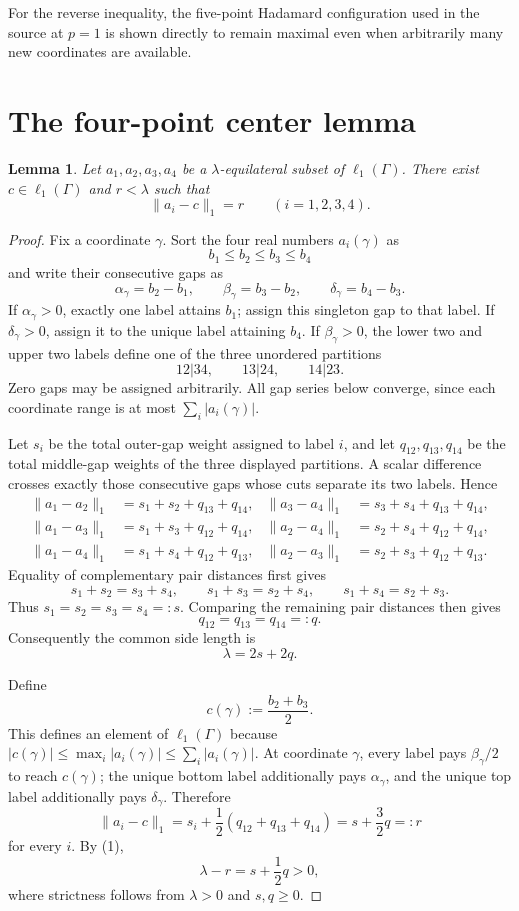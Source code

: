 \documentclass[11pt]{article}
\newtheorem{lemma}[theorem]{Lemma}
\newcommand{\ellone}{\ell_1}
\begin{document}
For the reverse inequality, the five-point Hadamard configuration used in the source at $p=1$ is shown directly to remain maximal even when arbitrarily many new coordinates are available.

\section{The four-point center lemma}

\begin{lemma}\label{lem:center}
Let $a_1,a_2,a_3,a_4$ be a $\lambda$-equilateral subset of $\ellone(\Gamma)$. There exist $c\in\ellone(\Gamma)$ and $r<\lambda$ such that
\[
 \|a_i-c\|_1=r\qquad(i=1,2,3,4).
\]
\end{lemma}

\begin{proof}
Fix a coordinate $\gamma$. Sort the four real numbers $a_i(\gamma)$ as
\[
 b_1\leq b_2\leq b_3\leq b_4
\]
and write their consecutive gaps as
\[
 \alpha_\gamma=b_2-b_1,\qquad
 \beta_\gamma=b_3-b_2,\qquad
 \delta_\gamma=b_4-b_3.
\]
If $\alpha_\gamma>0$, exactly one label attains $b_1$; assign this singleton gap to that label. If $\delta_\gamma>0$, assign it to the unique label attaining $b_4$. If $\beta_\gamma>0$, the lower two and upper two labels define one of the three unordered partitions
\[
 12|34,\qquad13|24,\qquad14|23.
\]
Zero gaps may be assigned arbitrarily. All gap series below converge, since each coordinate range is at most $\sum_i|a_i(\gamma)|$.

Let $s_i$ be the total outer-gap weight assigned to label $i$, and let $q_{12},q_{13},q_{14}$ be the total middle-gap weights of the three displayed partitions. A scalar difference crosses exactly those consecutive gaps whose cuts separate its two labels. Hence
\begin{align*}
 \|a_1-a_2\|_1&=s_1+s_2+q_{13}+q_{14},&
 \|a_3-a_4\|_1&=s_3+s_4+q_{13}+q_{14},\\
 \|a_1-a_3\|_1&=s_1+s_3+q_{12}+q_{14},&
 \|a_2-a_4\|_1&=s_2+s_4+q_{12}+q_{14},\\
 \|a_1-a_4\|_1&=s_1+s_4+q_{12}+q_{13},&
 \|a_2-a_3\|_1&=s_2+s_3+q_{12}+q_{13}.
\end{align*}
Equality of complementary pair distances first gives
\[
 s_1+s_2=s_3+s_4,\qquad
 s_1+s_3=s_2+s_4,\qquad
 s_1+s_4=s_2+s_3.
\]
Thus $s_1=s_2=s_3=s_4=:s$. Comparing the remaining pair distances then gives
\[
 q_{12}=q_{13}=q_{14}=:q.
\]
Consequently the common side length is
\[
 \lambda=2s+2q.\tag{1}
\]

Define
\[
 c(\gamma):=\frac{b_2+b_3}{2}.
\]
This defines an element of $\ellone(\Gamma)$ because
$|c(\gamma)|\leq\max_i|a_i(\gamma)|\leq\sum_i|a_i(\gamma)|$.
At coordinate $\gamma$, every label pays $\beta_\gamma/2$ to reach $c(\gamma)$; the unique bottom label additionally pays $\alpha_\gamma$, and the unique top label additionally pays $\delta_\gamma$. Therefore
\[
 \|a_i-c\|_1=s_i+\frac12(q_{12}+q_{13}+q_{14})
 =s+\frac32q=:r
\]
for every $i$. By (1),
\[
 \lambda-r=s+\frac12q>0,
\]
where strictness follows from $\lambda>0$ and $s,q\geq0$.
\end{proof}
\end{document}
